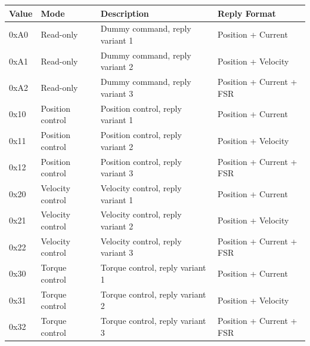 \documentclass[
  11pt,
]{article}
\newcounter{none} %
\begin{document}
{\def\LTcaptype{none} %
\begin{longtable}[]{@{}
  >{\raggedright\arraybackslash}p{}
  >{\raggedright\arraybackslash}p{}
  >{\raggedright\arraybackslash}p{}
  >{\raggedright\arraybackslash}p{}@{}}
\toprule\noalign{}
\begin{minipage}[b]{\linewidth}\raggedright
Value
\end{minipage} & \begin{minipage}[b]{\linewidth}\raggedright
Mode
\end{minipage} & \begin{minipage}[b]{\linewidth}\raggedright
Description
\end{minipage} & \begin{minipage}[b]{\linewidth}\raggedright
Reply Format
\end{minipage} \\
\midrule\noalign{}
\endhead
\bottomrule\noalign{}
\endlastfoot
0xA0 & Read-only & Dummy command, reply variant 1 & Position +
Current \\
0xA1 & Read-only & Dummy command, reply variant 2 & Position +
Velocity \\
0xA2 & Read-only & Dummy command, reply variant 3 & Position + Current +
FSR \\
0x10 & Position control & Position control, reply variant 1 & Position +
Current \\
0x11 & Position control & Position control, reply variant 2 & Position +
Velocity \\
0x12 & Position control & Position control, reply variant 3 & Position +
Current + FSR \\
0x20 & Velocity control & Velocity control, reply variant 1 & Position +
Current \\
0x21 & Velocity control & Velocity control, reply variant 2 & Position +
Velocity \\
0x22 & Velocity control & Velocity control, reply variant 3 & Position +
Current + FSR \\
0x30 & Torque control & Torque control, reply variant 1 & Position +
Current \\
0x31 & Torque control & Torque control, reply variant 2 & Position +
Velocity \\
0x32 & Torque control & Torque control, reply variant 3 & Position +
Current + FSR \\

\end{longtable}}
\end{document}
